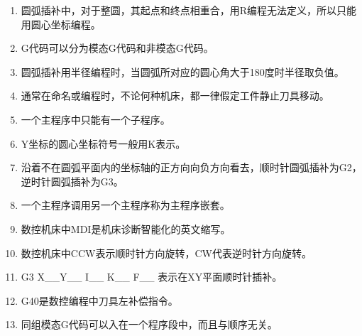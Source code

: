 \documentclass[12pt,twocolumn,landscape,UTF8,twoside]{ctexart}
\begin{document}
\begin{spacing}{1.3}
\begin{enumerate} [1、]
\item 圆弧插补中，对于整圆，其起点和终点相重合，用R编程无法定义，所以只能用圆心坐标编程。
\item G代码可以分为模态G代码和非模态G代码。
\item 圆弧插补用半径编程时，当圆弧所对应的圆心角大于180度时半径取负值。
\item 通常在命名或编程时，不论何种机床，都一律假定工件静止刀具移动。
\item 一个主程序中只能有一个子程序。
\item Y坐标的圆心坐标符号一般用K表示。
\item 沿着不在圆弧平面内的坐标轴的正方向向负方向看去，顺时针圆弧插补为G2，逆时针圆弧插补为G3。
\item 一个主程序调用另一个主程序称为主程序嵌套。
\item 数控机床中MDI是机床诊断智能化的英文缩写。
\item 数控机床中CCW表示顺时针方向旋转，CW代表逆时针方向旋转。
\item G3 X\_\_Y\_\_ I\_\_ K\_\_ F\_\_ 表示在XY平面顺时针插补。
\item G40是数控编程中刀具左补偿指令。
\item 同组模态G代码可以入在一个程序段中，而且与顺序无关。

\end{enumerate}
\end{spacing}
\end{document}
